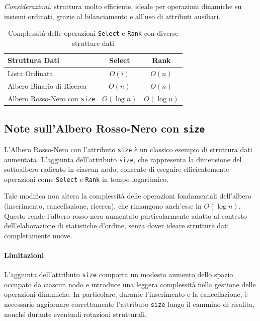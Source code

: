 \documentclass[10pt]{article}
\begin{document}
\noindent \textit{Considerazioni:} struttura molto efficiente, ideale per operazioni dinamiche su insiemi ordinati, grazie al bilanciamento e all’uso di attributi ausiliari.

\vspace{0.5cm}

\begin{table}[H]
\centering
\begin{tabular}{|l|c|c|}
\hline
\textbf{Struttura Dati} & \textbf{Select} & \textbf{Rank} \\
\hline
Lista Ordinata & $O(i)$ & $O(n)$ \\
Albero Binario di Ricerca & $O(n)$ & $O(n)$ \\
Albero Rosso-Nero con \texttt{size} & $O(\log n)$ & $O(\log n)$ \\
\hline
\end{tabular}
\caption{Complessità delle operazioni \texttt{Select} e \texttt{Rank} con diverse strutture dati}
\label{tab:complessita}
\end{table}
\subsection{Note sull'Albero Rosso-Nero con \texttt{size}}

L'Albero Rosso-Nero con l'attributo \texttt{size} è un classico esempio di struttura dati aumentata. L’aggiunta dell’attributo \texttt{size}, che rappresenta la dimensione del sottoalbero radicato in ciascun nodo, consente di eseguire efficientemente operazioni come \texttt{Select} e \texttt{Rank} in tempo logaritmico.

\noindent Tale modifica non altera la complessità delle operazioni fondamentali dell’albero (inserimento, cancellazione, ricerca), che rimangono anch’esse in $O(\log n)$. Questo rende l’albero rosso-nero aumentato particolarmente adatto al contesto dell’elaborazione di statistiche d’ordine, senza dover ideare strutture dati completamente nuove.

\paragraph{Limitazioni}

L’aggiunta dell’attributo \texttt{size} comporta un modesto aumento dello spazio occupato da ciascun nodo e introduce una leggera complessità nella gestione delle operazioni dinamiche. In particolare, durante l’inserimento e la cancellazione, è necessario aggiornare correttamente l’attributo \texttt{size} lungo il cammino di risalita, nonché durante eventuali rotazioni strutturali.
\end{document}

